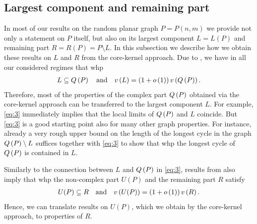 \subsection{Largest component and remaining part}\label{sub:largest_component}
In most of our results on the random planar graph $P=P(n,m)$ we provide not only a statement on $P$ itself, but also on its largest component $L=L(P)$ and remaining part $R=R(P)=P\setminus L$. In this subsection we describe how we obtain these results on $L$ and $R$ from the core-kernel approach. Due to \cite{KangLuczak2012,KangMosshammerSpruessel2020}, we have in all our considered regimes that whp
\begin{align}\label{eq:3}
    L\subseteq Q\left(P\right) \quad \text{and} \quad v\left({L}\right)=\left(1+o\left(1\right)\right)v\left({Q\left(P\right)}\right).
\end{align}
Therefore, most of the properties of the complex part $Q\left(P\right)$ obtained via the core-kernel approach can be transferred to the largest component $L$. For example, \eqref{eq:3} immediately implies that the local limits of $Q\left(P\right)$ and $L$ coincide. But \eqref{eq:3} is a good starting point also for many other graph properties. For instance, already a very rough upper bound on the length of the longest cycle in the graph $Q\left(P\right)\setminus L$ suffices together with \eqref{eq:3} to show that whp the longest cycle of $Q\left(P\right)$ is contained in $L$.

Similarly to the connection between $L$ and $Q\left(P\right)$ in \eqref{eq:3}, results from \cite{KangLuczak2012,KangMosshammerSpruessel2020} also imply that whp the non-complex part $U(P)$ and the remaining part $R$ satisfy
\begin{align*}
    U(P)\subseteq R \quad \text{and} \quad v\left({U(P)}\right)=\left(1+o\left(1\right)\right)v\left({R}\right).
\end{align*}
Hence, we can translate results on $U(P)$, which we obtain by the core-kernel approach, to properties of $R$.

